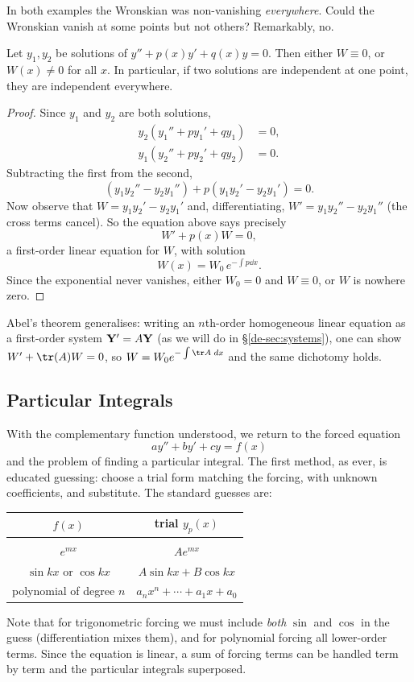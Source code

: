 \documentclass[a4paper]{scrartcl}
\begin{document}
In both examples the Wronskian was non-vanishing \emph{everywhere}. Could the Wronskian vanish at some points but not others? Remarkably, no.

\begin{theorem}
	Let $y_1, y_2$ be solutions of $y'' + p(x) y' + q(x) y = 0$. Then either $W \equiv 0$, or $W(x) \neq 0$ for all $x$. In particular, if two solutions are independent at one point, they are independent everywhere.
\end{theorem}
\begin{proof}
	Since $y_1$ and $y_2$ are both solutions,
	\begin{align*}
		y_2 (y_1'' + p y_1' + q y_1) &= 0, \\
		y_1 (y_2'' + p y_2' + q y_2) &= 0.
	\end{align*}
	Subtracting the first from the second,
	$$
	(y_1 y_2'' - y_2 y_1'') + p (y_1 y_2' - y_2 y_1') = 0.
	$$
	Now observe that $W = y_1 y_2' - y_2 y_1'$ and, differentiating, $W' = y_1 y_2'' - y_2 y_1''$ (the cross terms cancel). So the equation above says precisely
	$$
	W' + p(x) W = 0,
	$$
	a first-order linear equation for $W$, with solution
	$$
	W(x) = W_0 \, e^{-\int p \dd x}.
	$$
	Since the exponential never vanishes, either $W_0 = 0$ and $W \equiv 0$, or $W$ is nowhere zero.
\end{proof}

\begin{remark}
	Abel's theorem generalises: writing an $n$th-order homogeneous linear equation as a first-order system $\mathbf{Y}' = A \mathbf{Y}$ (as we will do in \S\ref{de-sec:systems}), one can show $W' + \tr(A) W = 0$, so $W = W_0 e^{-\int \tr A \dd x}$ and the same dichotomy holds.
\end{remark}

\subsection{Particular Integrals}

With the complementary function understood, we return to the forced equation
$$
a y'' + by' + cy = f(x)
$$
and the problem of finding a particular integral. The first method, as ever, is educated guessing: choose a trial form matching the forcing, with unknown coefficients, and substitute. The standard guesses are:
\begin{center}
	\begin{tabular}{cc}
		$f(x)$ & trial $y_p(x)$ \\[2pt]
		\hline \\[-8pt]
		$e^{mx}$ & $A e^{mx}$ \\
		$\sin kx$ or $\cos kx$ & $A \sin kx + B \cos kx$ \\
		polynomial of degree $n$ & $a_n x^n + \cdots + a_1 x + a_0$
	\end{tabular}
\end{center}
Note that for trigonometric forcing we must include \emph{both} $\sin$ and $\cos$ in the guess (differentiation mixes them), and for polynomial forcing all lower-order terms. Since the equation is linear, a sum of forcing terms can be handled term by term and the particular integrals superposed.
\end{document}
